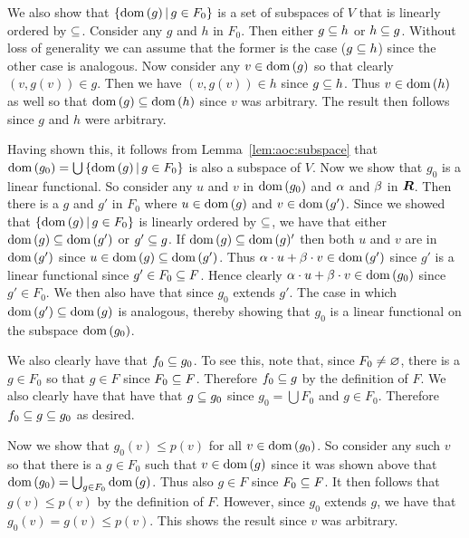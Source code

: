 \begin{questions}
{{    We also show that $\braces{\dom(g) \where g \in F_0}$ is a set of subspaces of $V$ that is linearly ordered by $\ss$.
    Consider any $g$ and $h$ in $F_0$.
    Then either $g \ss h$ or $h \ss g$.
    Without loss of generality we can assume that the former is the case ($g \ss h$) since the other case is analogous.
    Now consider any $v \in \dom(g)$ so that clearly $(v, g(v)) \in g$.
    Then we have $(v, g(v)) \in h$ since $g \ss h$.
    Thus $v \in \dom(h)$ as well so that $\dom(g) \ss \dom(h)$ since $v$ was arbitrary.
    The result then follows since $g$ and $h$ were arbitrary.
    
    Having shown this, it follows from Lemma~\ref{lem:aoc:subspace} that $\dom(g_0) = \bigcup \braces{\dom(g) \where g \in F_0}$ is also a subspace of $V$.
    Now we show that $g_0$ is a linear functional.
    So consider any $u$ and $v$ in $\dom(g_0)$ and $\a$ and $\b$ in $\reals$.
    Then there is a $g$ and $g'$ in $F_0$ where $u \in \dom(g)$ and $v \in \dom(g')$.
    Since we showed that $\braces{\dom(g) \where g \in F_0}$ is linearly ordered by $\ss$, we have that either $\dom(g) \ss \dom(g')$ or $g' \ss g$.
    If $\dom(g) \ss \dom(g)'$ then both $u$ and $v$ are in $\dom(g')$ since $u \in \dom(g) \ss \dom(g')$.
    Thus $\a \cdot u + \b \cdot v \in \dom(g')$ since $g'$ is a linear functional since $g' \in F_0 \ss F$.
    Hence clearly $\a \cdot u + \b \cdot v \in \dom(g_0)$ since $g' \in F_0$.
    We then also have that
    since $g_0$ extends $g'$.
    The case in which $\dom(g') \ss \dom(g)$ is analogous, thereby showing that $g_0$ is a linear functional on the subspace $\dom(g_0)$.

    We also clearly have that $f_0 \ss g_0$.
    To see this, note that, since $F_0 \neq \es$, there is a $g \in F_0$ so that $g \in F$ since $F_0 \ss F$.
    Therefore $f_0 \ss g$ by the definition of $F$.
    We also clearly have that have that $g \ss g_0$ since $g_0 = \bigcup F_0$ and $g \in F_0$.
    Therefore $f_0 \ss g \ss g_0$ as desired.

    Now we show that $g_0(v) \leq p(v)$ for all $v \in \dom(g_0)$.
    So consider any such $v$ so that there is a $g \in F_0$ such that $v \in \dom(g)$ since it was shown above that $\dom(g_0) = \bigcup_{g \in F_0} \dom(g)$.
    Thus also $g \in F$ since $F_0 \ss F$.
    It then follows that $g(v) \leq p(v)$ by the definition of $F$.
    However, since $g_0$ extends $g$, we have that $g_0(v) = g(v) \leq p(v)$.
    This shows the result since $v$ was arbitrary.

}}
\end{questions}
